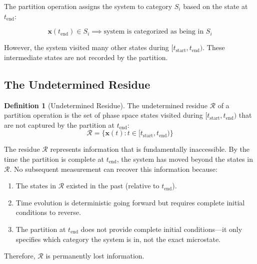 \documentclass[twocolumn,10pt]{article}
\theoremstyle{definition}
\newtheorem{definition}[theorem]{Definition}
\theoremstyle{remark}
\begin{document}
The partition operation assigns the system to category $S_i$ based on the state at $t_{\text{end}}$:

$$
\mathbf{x}(t_{\text{end}}) \in S_i \implies \text{system is categorized as being in } S_i
$$

However, the system visited many other states during $[t_{\text{start}}, t_{\text{end}})$. These intermediate states are not recorded by the partition.

\subsection{The Undetermined Residue}

\begin{definition}[Undetermined Residue]
The undetermined residue $\mathcal{R}$ of a partition operation is the set of phase space states visited during $[t_{\text{start}}, t_{\text{end}})$ that are not captured by the partition at $t_{\text{end}}$:
$$
\mathcal{R} = \{\mathbf{x}(t) : t \in [t_{\text{start}}, t_{\text{end}})\}
$$
\end{definition}

The residue $\mathcal{R}$ represents information that is fundamentally inaccessible. By the time the partition is complete at $t_{\text{end}}$, the system has moved beyond the states in $\mathcal{R}$. No subsequent measurement can recover this information because:

\begin{enumerate}
\item The states in $\mathcal{R}$ existed in the past (relative to $t_{\text{end}}$).
\item Time evolution is deterministic going forward but requires complete initial conditions to reverse.
\item The partition at $t_{\text{end}}$ does not provide complete initial conditions—it only specifies which category the system is in, not the exact microstate.
\end{enumerate}

Therefore, $\mathcal{R}$ is permanently lost information.
\end{document}
